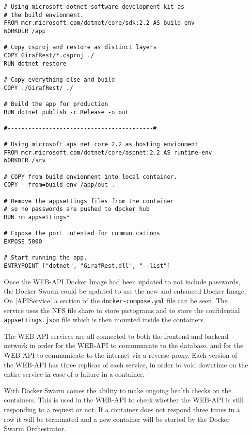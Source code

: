 \begin{lstlisting}[caption={API Dockerfile},captionpos=b,label=APIDockerfile,escapechar=\%]
# Using microsoft dotnet software development kit as
# the build envionment.
FROM mcr.microsoft.com/dotnet/core/sdk:2.2 AS build-env
WORKDIR /app

# Copy csproj and restore as distinct layers
COPY GirafRest/*.csproj ./
RUN dotnet restore

# Copy everything else and build
COPY ./GirafRest/ ./

# Build the app for production
RUN dotnet publish -c Release -o out

#------------------------------------------#

# Using microsoft aps net core 2.2 as hosting envionment
FROM mcr.microsoft.com/dotnet/core/aspnet:2.2 AS runtime-env
WORKDIR /srv

# COPY from build envionment into local container.
COPY --from=build-env /app/out .

# Remove the appsettings files from the container
# so no passwords are pushed to docker hub
RUN rm appsettings*

# Expose the port intented for communications
EXPOSE 5000

# Start running the app.
ENTRYPOINT ["dotnet", "GirafRest.dll", "--list"]
\end{lstlisting}

Once the WEB-API Docker Image had been updated to not include passwords, the Docker Swarm could be updated to use the new and enhanced Docker Image.
On \autoref{APIService} a section of the \lstinline$docker-compose.yml$ file can be seen.
The service uses the NFS file share to store pictograms and to store the confidential \lstinline$appsettings.json$ file which is then mounted inside the containers.

The WEB-API services are all connected to both the frontend and backend network in order for the WEB-API to communicate to the database, and for the WEB-API to communicate to the internet via a reverse proxy.
Each version of the WEB-API has three replicas of each service, in order to void downtime on the entire service in case of a failure in a container.

With Docker Swarm comes the ability to make ongoing health checks on the containers.
This is used in the WEB-API to check whether the WEB-API is still responding to a request or not.
If a container does not respond three times in a row it will be terminated and a new container will be started by the Docker Swarm Orchestrator.

